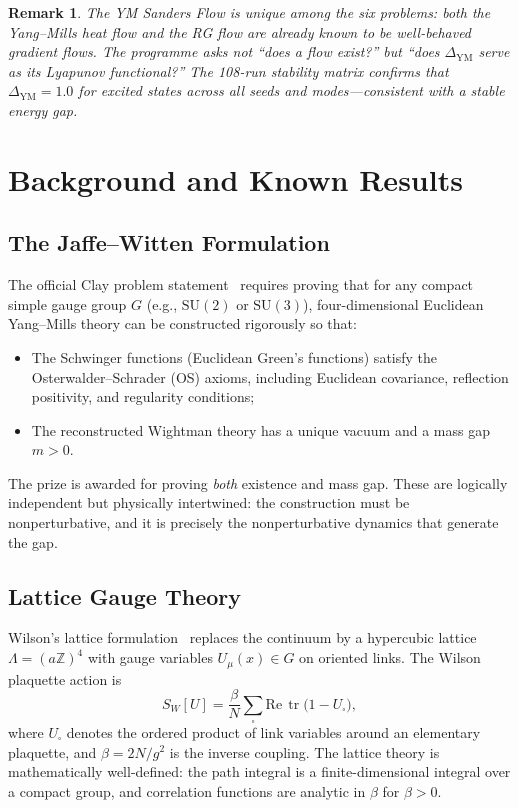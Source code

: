 \documentclass[11pt]{article}
\newtheorem{remark}[theorem]{Remark}
\DeclareMathOperator{\tr}{tr}
\begin{document}
\begin{remark}
The YM Sanders Flow is unique among the six problems: both the Yang--Mills heat flow
and the RG flow are \emph{already known} to be well-behaved gradient flows.  The
programme asks not ``does a flow exist?'' but ``does $\Delta_{\mathrm{YM}}$ serve as
its Lyapunov functional?''  The 108-run stability matrix confirms that
$\Delta_{\mathrm{YM}} = 1.0$ for excited states across all seeds and modes---consistent
with a stable energy gap.
\end{remark}

\section{Background and Known Results}
\label{sec:background}

\subsection{The Jaffe--Witten Formulation}

The official Clay problem statement~\cite{JW} requires proving that
for any compact simple gauge group $G$ (e.g., $\mathrm{SU}(2)$ or
$\mathrm{SU}(3)$), four-dimensional Euclidean Yang--Mills theory
can be constructed rigorously so that:
\begin{itemize}
  \item The Schwinger functions (Euclidean Green's functions) satisfy
    the Osterwalder--Schrader (OS) axioms, including Euclidean
    covariance, reflection positivity, and regularity conditions;
  \item The reconstructed Wightman theory has a unique vacuum and a
    mass gap $m > 0$.
\end{itemize}
The prize is awarded for proving \emph{both} existence and mass gap.
These are logically independent but physically intertwined: the
construction must be nonperturbative, and it is precisely the
nonperturbative dynamics that generate the gap.

\subsection{Lattice Gauge Theory}

Wilson's lattice formulation~\cite{Wilson} replaces the continuum by a
hypercubic lattice $\Lambda = (a\mathbb{Z})^4$ with gauge variables
$U_\mu(x) \in G$ on oriented links.  The Wilson plaquette action is
\begin{equation}\label{eq:wilson-action}
  S_W[U] = \frac{\beta}{N} \sum_{\square}
  \mathrm{Re}\,\tr\bigl(1 - U_\square\bigr),
\end{equation}
where $U_\square$ denotes the ordered product of link variables around
an elementary plaquette, and $\beta = 2N/g^2$ is the inverse coupling.
The lattice theory is mathematically well-defined: the path integral is
a finite-dimensional integral over a compact group, and correlation
functions are analytic in $\beta$ for $\beta > 0$.
\end{document}
